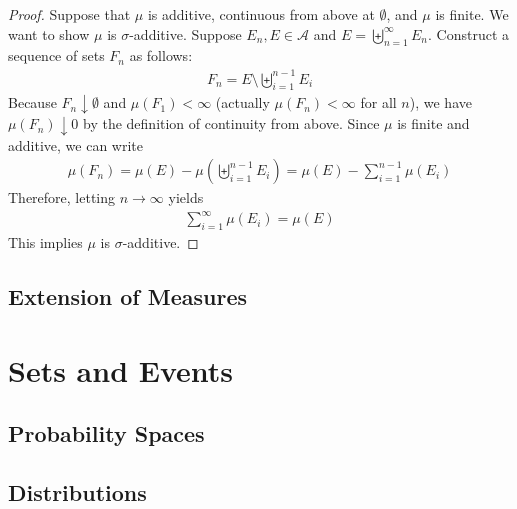 \documentclass[thmcnt=section, 12pt, color=purple]{my-elegantbook}
\begin{document}
\begin{proof}
	Suppose that $\mu$ is additive,
	continuous from above at $\emptyset$,
	and $\mu$ is finite.
	We want to show $\mu$ is $\sigma$-additive.
	Suppose $E_n, E \in \mathcal{A}$ 
	and $E = \biguplus_{n=1}^\infty E_n$.
	Construct a sequence of sets $F_n$ as follows:
	\begin{align*}
		F_n = E \setminus \biguplus_{i=1}^{n-1} E_i
	\end{align*}
	Because $F_n \downarrow \emptyset$
	and $\mu(F_1) < \infty$ (actually $\mu(F_n) < \infty$ for all $n$),
	we have $\mu(F_n) \downarrow 0$
	by the definition of continuity from above.
	Since $\mu$ is finite and additive, we can write 
	\begin{align*}
		\mu(F_n) = \mu(E) - \mu(\biguplus_{i=1}^{n-1} E_i)
		= \mu(E) - \sum_{i=1}^{n-1} \mu (E_i)
	\end{align*}
	Therefore, letting $n \to \infty$ yields 
	\begin{align*}
		\sum_{i=1}^\infty \mu(E_i) = \mu(E)
	\end{align*}
	This implies $\mu$ is $\sigma$-additive.
\end{proof}


\section{Extension of Measures}


\begin{theorem} \label{thm:1}
\end{theorem}


\chapter{Sets and Events}


\section{Probability Spaces}




\section{Distributions}




\printbibliography[heading=bibintoc, title=References]


\printindex

\end{document}
